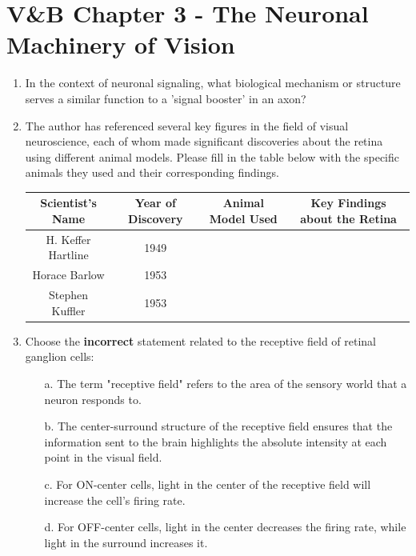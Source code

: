 \documentclass[11pt,letterpaper]{article}
\begin{document}
\section{V\&B Chapter 3 - The Neuronal Machinery of Vision}
\begin{enumerate}
    \item  In the context of neuronal signaling, what biological mechanism or structure serves a similar function to a 'signal booster' in an axon?

    \vspace{2 cm}

    \item The author has referenced several key figures in the field of visual neuroscience, each of whom made significant discoveries about the retina using different animal models. Please fill in the table below with the specific animals they used and their corresponding findings.
    \begin{table}[h]
        \centering
        \begin{tabular}{c|c|c|c}
            Scientist's Name & Year of Discovery & Animal Model Used & Key Findings about the Retina \\
            \hline
            \hline
            H. Keffer Hartline & 1949 & &\\
            \hline
            Horace Barlow & 1953 & & \\
            \hline
            Stephen Kuffler & 1953 & &\\
        \end{tabular}
    \end{table}

    \item Choose the \textbf{incorrect} statement related to the receptive field of retinal ganglion cells:
    \begin{enumerate}
        \item[a.] The term "receptive field" refers to the area of the sensory world that a neuron responds to.
        \item[b.] The center-surround structure of the receptive field ensures that the information sent to the brain highlights the absolute intensity at each point in the visual field.
        \item[c.] For ON-center cells, light in the center of the receptive field will increase the cell's firing rate.
        \item[d.] For OFF-center cells, light in the center decreases the firing rate, while light in the surround increases it.
    \end{enumerate}
    

\end{enumerate}
\end{document}
